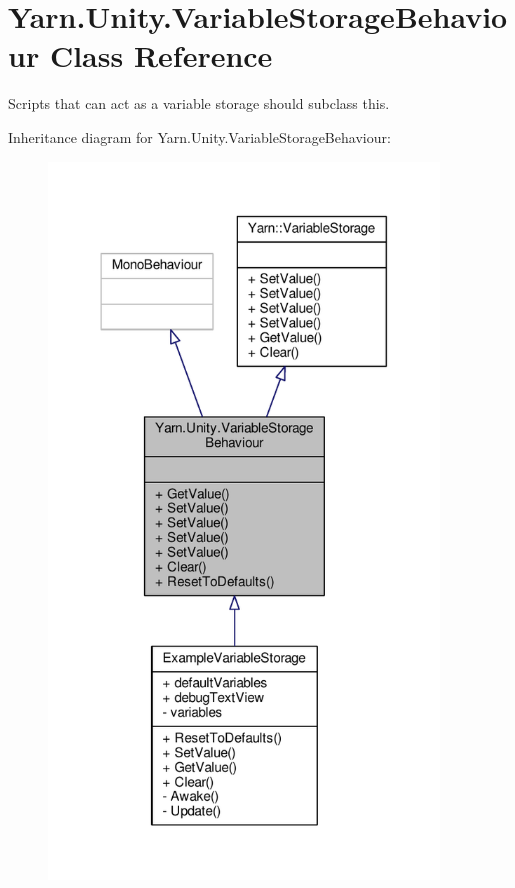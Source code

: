 \hypertarget{a00170}{\section{Yarn.\-Unity.\-Variable\-Storage\-Behaviour Class Reference}
\label{a00170}
}


Scripts that can act as a variable storage should subclass this.  




Inheritance diagram for Yarn.\-Unity.\-Variable\-Storage\-Behaviour\-:
\nopagebreak
\begin{figure}[H]
\begin{center}
\leavevmode
\includegraphics[width=294pt]{a00698}
\end{center}
\end{figure}


